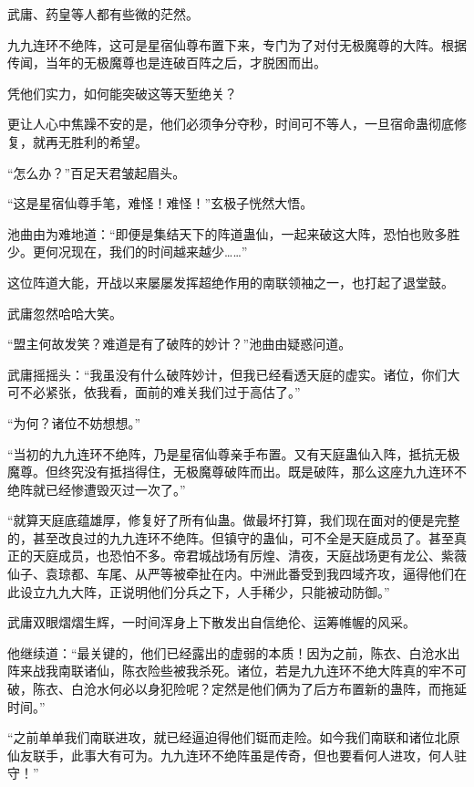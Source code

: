 
\begin{this_body}

武庸、药皇等人都有些微的茫然。

九九连环不绝阵，这可是星宿仙尊布置下来，专门为了对付无极魔尊的大阵。根据传闻，当年的无极魔尊也是连破百阵之后，才脱困而出。

凭他们实力，如何能突破这等天堑绝关？

更让人心中焦躁不安的是，他们必须争分夺秒，时间可不等人，一旦宿命蛊彻底修复，就再无胜利的希望。

“怎么办？”百足天君皱起眉头。

“这是星宿仙尊手笔，难怪！难怪！”玄极子恍然大悟。

池曲由为难地道：“即便是集结天下的阵道蛊仙，一起来破这大阵，恐怕也败多胜少。更何况现在，我们的时间越来越少……”

这位阵道大能，开战以来屡屡发挥超绝作用的南联领袖之一，也打起了退堂鼓。

武庸忽然哈哈大笑。

“盟主何故发笑？难道是有了破阵的妙计？”池曲由疑惑问道。

武庸摇摇头：“我虽没有什么破阵妙计，但我已经看透天庭的虚实。诸位，你们大可不必紧张，依我看，面前的难关我们过于高估了。”

“为何？诸位不妨想想。”

“当初的九九连环不绝阵，乃是星宿仙尊亲手布置。又有天庭蛊仙入阵，抵抗无极魔尊。但终究没有抵挡得住，无极魔尊破阵而出。既是破阵，那么这座九九连环不绝阵就已经惨遭毁灭过一次了。”

“就算天庭底蕴雄厚，修复好了所有仙蛊。做最坏打算，我们现在面对的便是完整的，甚至改良过的九九连环不绝阵。但镇守的蛊仙，可不全是天庭成员了。甚至真正的天庭成员，也恐怕不多。帝君城战场有厉煌、清夜，天庭战场更有龙公、紫薇仙子、袁琼都、车尾、从严等被牵扯在内。中洲此番受到我四域齐攻，逼得他们在此设立九九大阵，正说明他们分兵之下，人手稀少，只能被动防御。”

武庸双眼熠熠生辉，一时间浑身上下散发出自信绝伦、运筹帷幄的风采。

他继续道：“最关键的，他们已经露出的虚弱的本质！因为之前，陈衣、白沧水出阵来战我南联诸仙，陈衣险些被我杀死。诸位，若是九九连环不绝大阵真的牢不可破，陈衣、白沧水何必以身犯险呢？定然是他们俩为了后方布置新的蛊阵，而拖延时间。”

“之前单单我们南联进攻，就已经逼迫得他们铤而走险。如今我们南联和诸位北原仙友联手，此事大有可为。九九连环不绝阵虽是传奇，但也要看何人进攻，何人驻守！”


\end{this_body}
